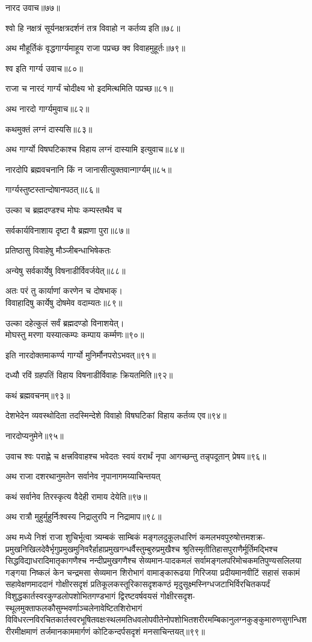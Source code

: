 \begin{flushleft}
नारद उवाच॥७७॥

श्वो हि नक्षत्रं सूर्यनक्षत्रदर्शनं तत्र विवाहो न कर्तव्य इति॥७८॥

अथ मौहूर्तिकं वृद्धगार्ग्यमाहूय राजा पप्रच्छ क्व विवाहमुहूर्तः॥७९॥

श्व इति गार्ग्य उवाच॥८०॥

राजा च नारदं गार्ग्यं चोदीक्ष्य भो इदमित्थमिति पप्रच्छ॥८१॥

अथ नारदो गार्ग्यमुवाच॥८२॥

कथमुक्तं लग्नं दास्यसि॥८३॥

अथ गार्ग्यो विषघटिकाश्च विहाय लग्नं दास्यामि इत्युवाच॥८४॥

नारदोपि ब्रह्मवचनानि किं न जानासीत्युक्तवान्गार्ग्यम्॥८५॥

गार्ग्यस्तुष्टस्तान्दोषानपठत्॥८६॥

उल्का च ब्रह्मदण्डश्च मोघः कम्पस्तथैव च

सर्वकार्यविनाशाय दृष्टा वै ब्रह्मणा पुरा॥८७॥

प्रतिष्ठासु विवाहेषु मौञ्जीबन्धाभिषेकतः

अन्येषु सर्वकार्येषु विषनाडीर्विवर्जयेत्॥८८॥

अतः परं तु कार्याणां करणेन च दोषभाक्।\\
विवाहादिषु कार्येषु दोषमेव वदाम्यतः॥८९॥

उल्का दहेत्कुलं सर्वं ब्रह्मदण्डो विनाशयेत्।\\
मोघस्तु मरणा यस्यात्कम्पः कम्पाय कर्म्मणः॥९०॥

इति नारदोक्तमाकर्ण्य गार्ग्यो मुनिर्मौनपरोऽभवत्॥९१॥

दध्यौ रविं ग्रहपतिं विहाय विषनाडीर्विवाहः क्रियतमिति॥९२॥


कथं ब्रह्मवचनम्॥९३॥


देशभेदेन व्यवस्थोदिता तदस्मिन्देशे विवाहो विषघटिकां विहाय कर्तव्य एव॥९४॥

नारदोप्यनुमेने॥९५॥

उवाच श्वः पराह्णे च क्षत्त्रविवाहश्च भवेदतः स्वयं वरार्थं नृपा आगच्छन्तु तन्नृपदूतान् प्रेषय॥९६॥

अथ राजा दशरथानुमतेन सर्वानेव नृपानागमय्याचिन्तयत्

कथं सर्वानेव तिरस्कृत्य वैदेही रामाय देयेति॥९७॥

अथ रात्रौ मुहुर्मुहुर्निःश्वस्य निद्रालुरपि न निद्रामाप॥९८॥

अथ मध्ये निशं राजा शुचिर्भूत्वा त्र्यम्बकं साम्बिकं मङ्गलदुकूलधारिणं कमलभवपुरुषोत्तमशक्र-प्रमुखनिखिलदेवैर्भृगुप्रमुखमुनिवरैर्हाहाप्रमुखगन्धर्वैस्तुम्बुरुप्रमुखैश्च श्रुतिस्मृतीतिहासपुराणैर्मूर्तिमद्भिश्च सिद्धविद्याधरादिमातृकागणैश्च नन्दीप्रमुखगणैश्च सेव्यमान-पादकमलं सर्वामङ्गलपरिमोचकमतिपुण्यसलिलया गङ्गया निष्कलं केन चन्द्रमसा सेव्यमान शिरोभागं वामाङ्कारूढया गिरिजया प्रदीयमानवीटिं सहासं सकामं सहावेक्षणमाददानं गोक्षीरसदृशं प्रतिकूलकस्तूरिकासदृशकण्ठं मृदुसूक्ष्मस्निग्धजटाभिर्विरचितकपर्दं विशुद्धकार्तस्वरकुण्डलोपशोभितगण्डभागं द्विरष्टवर्षवयसं गोक्षीरसदृश-स्थूलमुक्ताफलकौसुम्भवर्णाञ्चलेनावेष्टितशिरोभागं विविधरत्नविरचितकार्तस्वरभूषितवक्षःस्थलमतिधवलोपवीतेनोपशोभितशरीरमम्बिकानुलग्नकुङ्कुमारुणसुगन्धिशरीरमीक्षमाणं तर्जमानकाममार्गणं कोटिकन्दर्पसदृशं मनसाचिन्तयत्॥९९॥


\end{flushleft}
